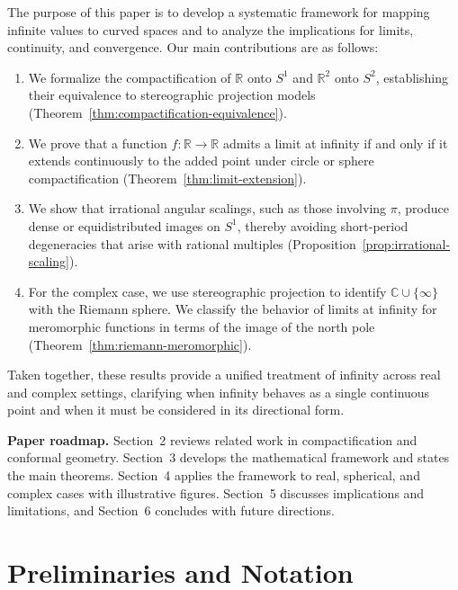 \documentclass[12pt]{article}
\theoremstyle{remark}
\begin{document}
The purpose of this paper is to develop a systematic framework for mapping 
infinite values to curved spaces and to analyze the implications for limits, 
continuity, and convergence. Our main contributions are as follows:  

\begin{enumerate}
    \item We formalize the compactification of $\mathbb{R}$ onto $S^1$ and 
    $\mathbb{R}^2$ onto $S^2$, establishing their equivalence to stereographic 
    projection models (Theorem~\ref{thm:compactification-equivalence}).  
    \item We prove that a function $f : \mathbb{R} \to \mathbb{R}$ admits a limit 
    at infinity if and only if it extends continuously to the added point under 
    circle or sphere compactification (Theorem~\ref{thm:limit-extension}).  
    \item We show that irrational angular scalings, such as those involving $\pi$, 
    produce dense or equidistributed images on $S^1$, thereby avoiding 
    short-period degeneracies that arise with rational multiples 
    (Proposition~\ref{prop:irrational-scaling}).  
    \item For the complex case, we use stereographic projection to identify 
    $\mathbb{C} \cup \{\infty\}$ with the Riemann sphere. We classify the behavior 
    of limits at infinity for meromorphic functions in terms of the image of the 
    north pole (Theorem~\ref{thm:riemann-meromorphic}).  
\end{enumerate}

Taken together, these results provide a unified treatment of infinity across real 
and complex settings, clarifying when infinity behaves as a single continuous 
point and when it must be considered in its directional form.  

\textbf{Paper roadmap.} Section~2 reviews related work in compactification and 
conformal geometry. Section~3 develops the mathematical framework and states the 
main theorems. Section~4 applies the framework to real, spherical, and complex 
cases with illustrative figures. Section~5 discusses implications and limitations, 
and Section~6 concludes with future directions.  

\section{Preliminaries and Notation}
\label{sec:preliminaries}
\end{document}
